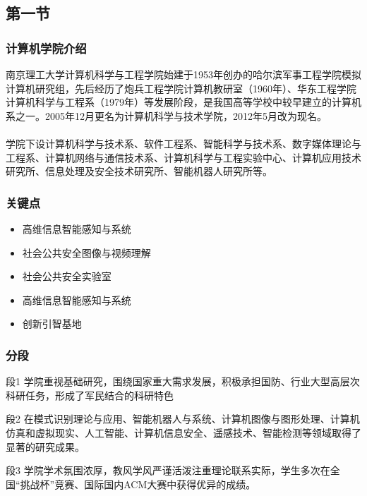 \subsection{第一节} %

\begin{frame}
\frametitle{计算机学院介绍}
南京理工大学计算机科学与工程学院始建于1953年创办的哈尔滨军事工程学院模拟计算机研究组，先后经历了炮兵工程学院计算机教研室（1960年）、华东工程学院计算机科学与工程系（1979年）等发展阶段，是我国高等学校中较早建立的计算机系之一。2005年12月更名为计算机科学与技术学院，2012年5月改为现名。\\~\\

学院下设计算机科学与技术系、软件工程系、智能科学与技术系、数字媒体理论与工程系、计算机网络与通信技术系、计算机科学与工程实验中心、计算机应用技术研究所、信息处理及安全技术研究所、智能机器人研究所等。
\end{frame}


\begin{frame}
\frametitle{关键点}
\begin{itemize}
\item 高维信息智能感知与系统
\item 社会公共安全图像与视频理解
\item 社会公共安全实验室
\item 高维信息智能感知与系统
\item 创新引智基地
\end{itemize}
\end{frame}


\begin{frame}
\frametitle{分段}
\begin{block}{段1}
学院重视基础研究，围绕国家重大需求发展，积极承担国防、行业大型高层次科研任务，形成了军民结合的科研特色
\end{block}

\begin{block}{段2}
在模式识别理论与应用、智能机器人与系统、计算机图像与图形处理、计算机仿真和虚拟现实、人工智能、计算机信息安全、遥感技术、智能检测等领域取得了显著的研究成果。
\end{block}

\begin{block}{段3}
学院学术氛围浓厚，教风学风严谨活泼注重理论联系实际，学生多次在全国“挑战杯”竞赛、国际国内ACM大赛中获得优异的成绩。
\end{block}
\end{frame}

